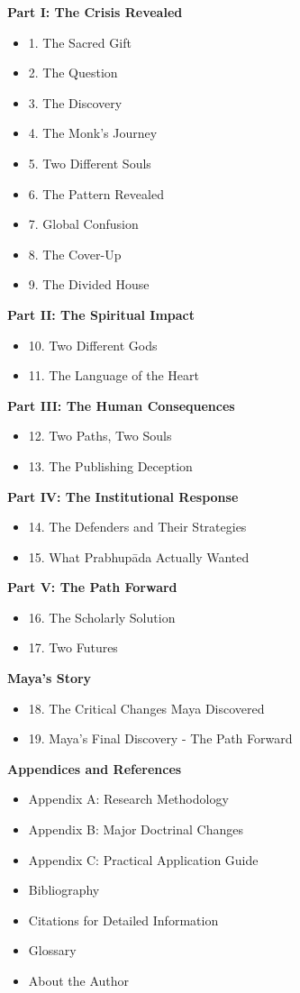 \documentclass[11pt,twoside]{book}
\begin{document}
\setlength{\parskip}{1pt}
\textbf{Part I: The Crisis Revealed}
\begin{itemize}
\item 1. The Sacred Gift
\item 2. The Question
\item 3. The Discovery
\item 4. The Monk's Journey
\item 5. Two Different Souls
\item 6. The Pattern Revealed
\item 7. Global Confusion
\item 8. The Cover-Up
\item 9. The Divided House
\end{itemize}
\vspace{0.3cm}
\textbf{Part II: The Spiritual Impact}
\begin{itemize}
\item 10. Two Different Gods
\item 11. The Language of the Heart
\end{itemize}
\vspace{0.3cm}
\textbf{Part III: The Human Consequences}
\begin{itemize}
\item 12. Two Paths, Two Souls
\item 13. The Publishing Deception
\end{itemize}
\vspace{0.3cm}
\textbf{Part IV: The Institutional Response}
\begin{itemize}
\item 14. The Defenders and Their Strategies
\item 15. What Prabhupāda Actually Wanted
\end{itemize}
\vspace{0.3cm}
\textbf{Part V: The Path Forward}
\begin{itemize}
\item 16. The Scholarly Solution
\item 17. Two Futures
\end{itemize}
\vspace{0.3cm}
\textbf{Maya's Story}
\begin{itemize}
\item 18. The Critical Changes Maya Discovered
\item 19. Maya's Final Discovery - The Path Forward
\end{itemize}
\vspace{0.3cm}
\textbf{Appendices and References}
\begin{itemize}
\item Appendix A: Research Methodology
\item Appendix B: Major Doctrinal Changes
\item Appendix C: Practical Application Guide
\item Bibliography
\item Citations for Detailed Information
\item Glossary
\item About the Author
\end{itemize}
\end{document}
